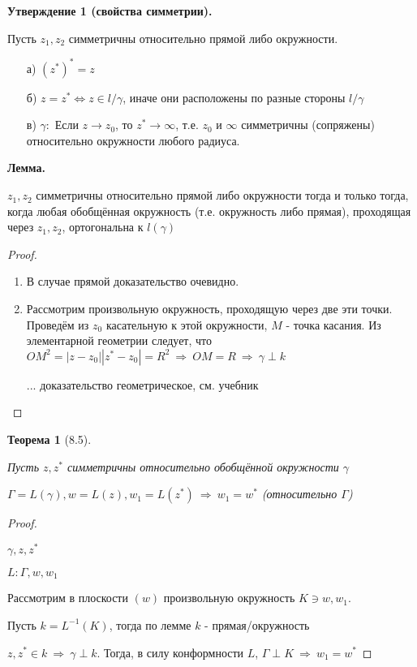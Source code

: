 \documentclass[draft]{report}
\newcommand{\forcenewline}{$\phantom{\mbox{newline}}$}
\newcommand{\then}{\ \Rightarrow\ }
\newcommand{\LRA}{\Leftrightarrow}
\newcommand{\g}{\gamma}
\newtheorem*{theor}{Теорема}
\theoremstyle{remark}
\begin{document}
{\bfseries Утверждение 1 (свойства симметрии).}

Пусть $z_1, z_2$ симметричны относительно прямой либо окружности.
\begin{enumerate}
\item[а)] $(z^*)^*=z$
\item[б)] $z=z^* \LRA z\in l/\g$, иначе они расположены по разные стороны $l/\g$
\item[в)] $\g\colon$ Если $z\to z_0$, то $z^*\to\infty$, т.е. $z_0$ и $\infty$ симметричны (сопряжены) относительно окружности любого радиуса.
\end{enumerate}

{\bfseries Лемма.}

$z_1, z_2$ симметричны относительно прямой либо окружности тогда и только тогда, когда любая обобщённая окружность (т.е. окружность либо прямая), проходящая через $z_1, z_2$, ортогональна к $l(\g)$
\begin{proof}
\forcenewline
\begin{enumerate}
\item В случае прямой доказательство очевидно.
\item Рассмотрим произвольную окружность, проходящую через две эти точки. Проведём из $z_0$ касательную к этой окружности, $M$ - точка касания. Из элементарной геометрии следует, что $OM^2=|z-z_0||z^*-z_0|=R^2 \then OM=R \then \g\perp k$

... доказательство геометрическое, см. учебник
\end{enumerate}
\end{proof}

\begin{theor}[8.5]
\forcenewline

Пусть $z,z^*$ симметричны относительно обобщённой окружности $\g$

$\Gamma=L(\g), w=L(z), w_1=L(z^*) \then w_1=w^*$ (относительно $\Gamma$)
\end{theor}

\begin{proof}
\forcenewline

$\g,z,z^*$

$L\colon \Gamma,w,w_1$

Рассмотрим в плоскости $(w)$ произвольную окружность $K\ni w,w_1$.

Пусть $k=L^{-1}(K)$, тогда по лемме $k$ - прямая/окружность

$z,z^*\in k\then \g\perp k$. Тогда, в силу конформности $L$, $\Gamma\perp K \then w_1=w^*$
\end{proof}
\end{document}
